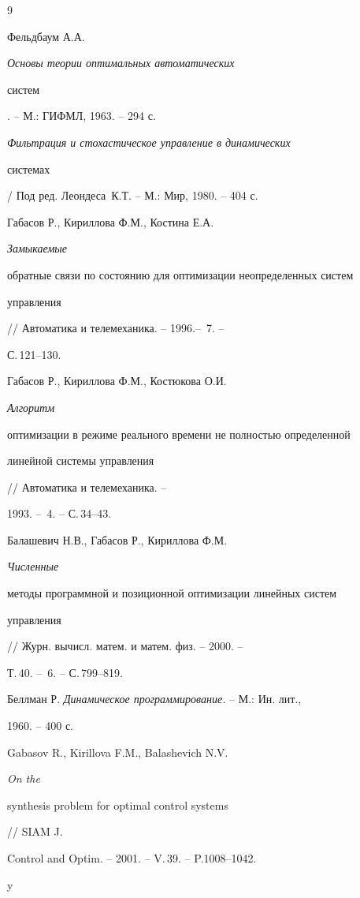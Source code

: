 \begin{thebibliography}{9}







Фельдбаум А.А. {\it Основы теории оптимальных автоматических


систем}. -- М.: ГИФМЛ, 1963. -- 294 с.




{\it Фильтрация и стохастическое управление в динамических


системах} / Под ред. Ле\-он\-де\-са~К.Т. -- М.: Мир, 1980. -- 404 с.




Габасов Р., Кириллова Ф.М., Костина Е.А. {\it Замыкаемые


обратные связи по состоянию для оптимизации неопределенных систем


управления} // Автоматика и телемеханика. -- 1996.-- \No\,7. --


С.\,121--130.




Габасов Р., Кириллова Ф.М., Костюкова О.И. {\it Алгоритм


оптимизации в режиме реального времени не полностью определенной


линейной системы управления} // Автоматика и телемеханика. --


1993. -- \No\,4. -- С.\,34--43.




Балашевич Н.В., Габасов Р., Кириллова Ф.М. {\it Численные


методы программной и позиционной оптимизации линейных систем


управления}


// Журн. вычисл. матем. и матем. физ. -- 2000. --


Т.\,40. -- \No\,6. -- С.\,799--819.




Беллман Р. {\it Динамическое программирование.} -- М.: Ин. лит.,


1960. -- 400 с.




Gabasov R., Kirillova F.M., Balashevich N.V. {\it On the


synthesis problem for optimal control systems} // SIAM J.


Control and Optim. -- 2001. -- V.\,39. -- P.1008--1042.





\end{thebibliography}





\vskip 2cm














\label{end}








y



